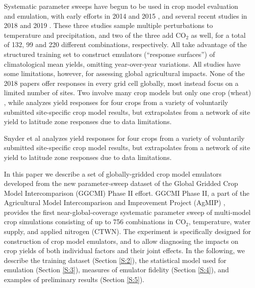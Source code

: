 \documentclass[gmd, manuscript]{copernicus} %
\begin{document}
Systematic parameter sweeps have begun to be used in crop model evaluation and emulation, with early efforts in 2014 and 2015 \citep{ruane2014, Markowski2015, Pirttioja2015}, and several recent studies in 2018 and 2019 \citep{FRONZEK20182, Snyder2018, RUIZRAMOS2018}. 
These three studies sample multiple perturbations to temperature and precipitation, and two of the three add CO$_2$ as well, for a total of 132, 99 and 220 different combinations, respectively. 
All take advantage of the structured training set to construct emulators (``response surfaces'') of climatological mean yields, omitting year-over-year variations. 
All studies have some limitations, however, for assessing global agricultural impacts. 
None of the 2018 papers offer responses in every grid cell globally, most instead focus on a limited number of sites.
Two involve many crop models but only one crop (wheat) \citep{FRONZEK20182,RUIZRAMOS2018}, while \citet{Snyder2018} analyzes yield responses for four crops from a variety of voluntarily submitted site-specific crop model results, but extrapolates from a network of site yield to latitude zone responses due to data limitations.

Snyder et al analyzes yield responses for four crops from a variety of voluntarily submitted site-specific crop model results, but extrapolates from a network of site yield to latitude zone responses due to data limitations.

In this paper we describe a set of globally-gridded crop model emulators developed from the new parameter-sweep dataset of the Global Gridded Crop Model Intercomparison (GGCMI) Phase II effort. 
GGCMI Phase II, a part of the Agricultural Model Intercomparison and Improvement Project (AgMIP) \citep{ROSENZWEIG2013, Rosenzweig2014}, provides the first near-global-coverage systematic parameter sweep of multi-model crop simulations consisting of up to 756 combinations in CO$_2$, temperature, water supply, and applied nitrogen (CTWN). 
The experiment is specifically designed for construction of crop model emulators, and to allow diagnosing the impacts on crop yields of both individual factors and their joint effects.
In the following, we describe the training dataset (Section \ref{S:2}), the statistical model used for emulation (Section \ref{S:3}), measures of emulator fidelity (Section \ref{S:4}), and examples of preliminary results (Section \ref{S:5}). 
\end{document}
